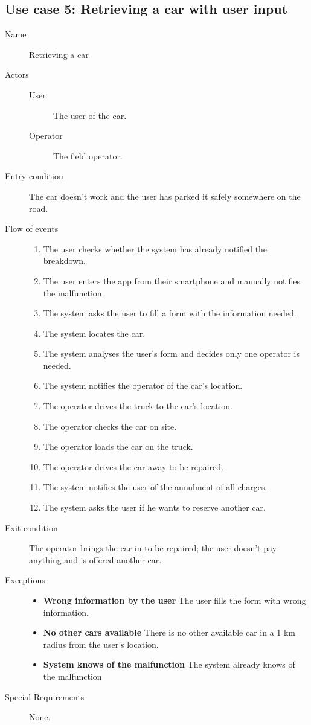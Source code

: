 	\subsection{Use case 5: Retrieving a car with user input}
		\begin{description}
			\item[Name] Retrieving a car
			\item[Actors] \hfill
			\begin{description}
				\item[User] The user of the car.
				\item[Operator] The field operator.
			\end{description}
			\item[Entry condition] The car doesn't work and the user has parked it safely somewhere on the road.
			\item[Flow of events] \hfill
			\begin{enumerate}
				\item The user checks whether the system has already notified the breakdown.
				\item The user enters the app from their smartphone and manually notifies the malfunction.
				\item The system asks the user to fill a form with the information needed.
				\item The system locates the car.
				\item The system analyses the user's form and decides only one operator is needed.
				\item The system notifies the operator of the car's location.
				\item The operator drives the truck to the car's location.
				\item The operator checks the car on site.
				\item The operator loads the car on the truck.
				\item The operator drives the car away to be repaired.
				\item The system notifies the user of the annulment of all charges. %
				\item The system asks the user if he wants to reserve another car.
			\end{enumerate}
			\item[Exit condition] The operator brings the car in to be repaired; the user doesn't pay anything and is offered another car.
			\item[Exceptions] \hfill
			\begin{itemize}
				\item \textbf{Wrong information by the user} The user fills the form with wrong information.
				\item \textbf{No other cars available} There is no other available car in a 1 km radius from the user's location.
				\item \textbf{System knows of the malfunction} The system already knows of the malfunction %
			\end{itemize}
			\item[Special Requirements] None.
		\end{description}
